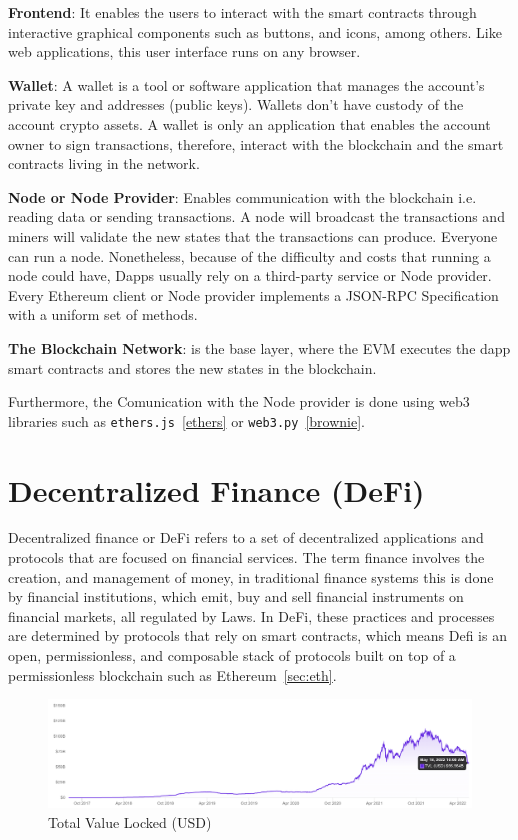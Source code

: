 \documentclass[11pt,a4paper]{report}
\begin{document}
\begin{description}		
	\item \textbf{Frontend}: It enables the users to interact with the smart contracts through interactive graphical components such as buttons, and icons, among others. Like web applications, this user interface runs on any browser.
	\item \textbf{Wallet}: A wallet is a tool or software application that manages the account's private key and addresses (public keys). Wallets don't have custody of the account crypto assets. A wallet is only an application that enables the account owner to sign transactions, therefore, interact with the blockchain and the smart contracts living in the network.
	\item \textbf{Node or Node Provider}: Enables communication with the blockchain i.e. reading data or sending transactions. A node will broadcast the transactions and miners will validate the new states that the transactions can produce. Everyone can run a node. Nonetheless, because of the difficulty and costs that running a node could have, Dapps usually rely on a third-party service or Node provider. Every Ethereum client or Node provider implements a JSON-RPC\cite{json_rpc} Specification with a uniform set of methods.
	\item \textbf{The Blockchain Network}: is the base layer, where the EVM executes the dapp smart contracts and stores the new states in the blockchain.
\end{description}
Furthermore, the Comunication with the Node provider is done using web3 libraries such as \verb|ethers.js|~\ref{ethers} or \verb|web3.py|~\ref{brownie}.
\chapter{Decentralized Finance (DeFi)} \label{ch:defi}
Decentralized finance or DeFi\cite{article:cefidefi}\cite{article:defi} refers to a set of decentralized applications and protocols that are focused on financial services. The term finance\cite{wiki:Finance} involves the creation, and management of money, in traditional finance systems this is done by financial institutions\cite{wiki:Financial_institution}, which emit, buy and sell financial instruments\cite{wiki:Financial_instrument} on financial markets\cite{wiki:Financial_market}, all regulated by Laws. In DeFi,  these practices and processes are determined by protocols that rely on smart contracts, which means Defi is an open, permissionless, and composable stack of protocols built on top of a permissionless blockchain such as Ethereum~\ref{sec:eth}. 
\begin{figure}[htp]
	\centering
	\includegraphics[width=1\textwidth]{./images/tvl}
	\caption{Total Value Locked (USD)\cite{defipulse}}
	\label{fig:tvl}
\end{figure}
\end{document}
